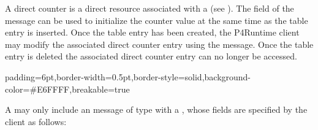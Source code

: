 \documentclass[11pt]{article}
\begin{document}
{%
\noindent{}A direct counter is a direct resource associated with a  (see
). The  field of the
 message can be used to initialize the counter value at the same
time as the table entry is inserted. Once the table entry has been created, the
P4Runtime client may modify the associated direct counter entry using the
 message. Once the table entry is deleted the associated
direct counter entry can no longer be accessed.%

\begin{mdbmargintb}{6pt}{6pt}%
\begin{mdblock}{padding=6pt,border-width=0.5pt,border-style=solid,background-color=\#E6FFFF,breakable=true}%
\begin{mdpre}%
\end{mdpre}%
\end{mdblock}%
\end{mdbmargintb}%

\noindent{}A  may only include an  message of type  with a
, whose fields are specified by the client as follows:%

\begin{itemize}%


\end{itemize}}
\end{document}

